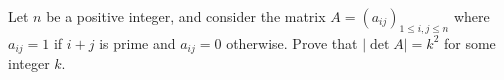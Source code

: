 Let \( n\) be a positive integer, and consider the matrix \( A = (a_{ij})_{1\leq i,j\leq n}\) where \( a_{ij} = 1\) if \( i+j\) is prime and \( a_{ij} = 0\) otherwise.
Prove that \( |\det A| = k^2\) for some integer \( k\).